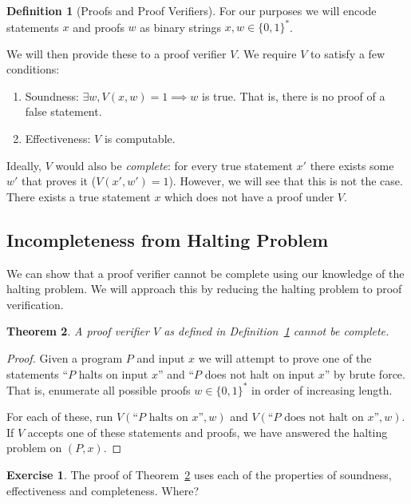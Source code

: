\documentclass[11pt]{article}
\newtheorem{theorem}{Theorem}
\theoremstyle{definition}
\newtheorem{defn}[theorem]{Definition}
\newtheorem{exercise}{Exercise}
\theoremstyle{remark}
\begin{document}
\begin{defn}[Proofs and Proof Verifiers]
  \label{def:ppv}
  For our purposes we will encode statements $x$ and proofs $w$ as
  binary strings $x, w \in \{0,1\}^*$.

  We will then provide these to a proof verifier $V$. We require $V$
  to satisfy a few conditions:
  \begin{enumerate}
  \item Soundness: $\exists w, V(x, w) = 1 \implies w$ is true. That
    is, there is no proof of a false statement.
  \item Effectiveness: $V$ is computable.
  \end{enumerate}
\end{defn}

Ideally, $V$ would also be \emph{complete}: for every true statement $x'$
there exists some $w'$ that proves it
($V(x', w') = 1$). However, we will see that this is not the
case. There exists a true statement $x$ which does not have a proof
under $V$.

\subsection{Incompleteness from Halting Problem}
We can show that a proof verifier cannot be complete using our
knowledge of the halting problem. We will approach this by reducing
the halting problem to proof verification.

\begin{theorem}
  \label{thm:incomplete}
  A proof verifier $V$ as defined in Definition~\ref{def:ppv} cannot
  be complete.
\end{theorem}
\begin{proof}
  Given a program $P$ and input $x$ we will attempt to prove one of
  the statements ``$P$ halts on input $x$'' and ``$P$ does not halt on
  input $x$'' by brute force. That is, enumerate all possible proofs
  $w \in \{0,1\}^*$ in order of increasing length.

  For each of these, run $V(\text{``$P$ halts on $x$''}, w)$ and
  $V(\text{``$P$ does not halt on $x$''}, w)$. If $V$ accepts one of
  these statements and proofs, we have answered the halting problem on
  $(P, x)$.
\end{proof}

\begin{exercise}
  The proof of Theorem~\ref{thm:incomplete} uses each of the
  properties of soundness, effectiveness and completeness. Where?
\end{exercise}
\end{document}

